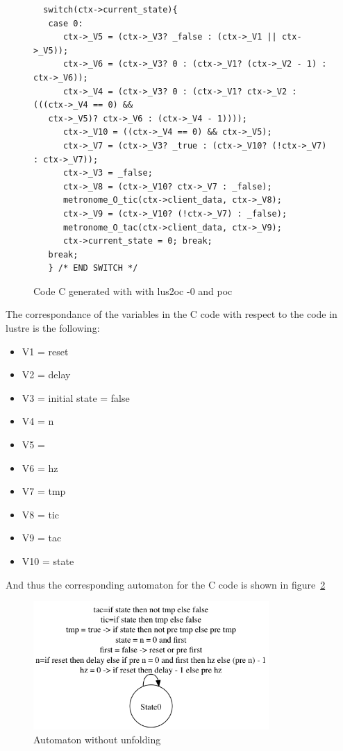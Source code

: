 \documentclass{article}
\begin{document}
\begin{figure}[ht]

\begin{verbatim}
  switch(ctx->current_state){
   case 0:
      ctx->_V5 = (ctx->_V3? _false : (ctx->_V1 || ctx->_V5));
      ctx->_V6 = (ctx->_V3? 0 : (ctx->_V1? (ctx->_V2 - 1) : ctx->_V6));
      ctx->_V4 = (ctx->_V3? 0 : (ctx->_V1? ctx->_V2 : (((ctx->_V4 == 0) &&
   ctx->_V5)? ctx->_V6 : (ctx->_V4 - 1))));
      ctx->_V10 = ((ctx->_V4 == 0) && ctx->_V5);
      ctx->_V7 = (ctx->_V3? _true : (ctx->_V10? (!ctx->_V7) : ctx->_V7));
      ctx->_V3 = _false;
      ctx->_V8 = (ctx->_V10? ctx->_V7 : _false);
      metronome_O_tic(ctx->client_data, ctx->_V8);
      ctx->_V9 = (ctx->_V10? (!ctx->_V7) : _false);
      metronome_O_tac(ctx->client_data, ctx->_V9);
      ctx->current_state = 0; break;
   break;
   } /* END SWITCH */
\end{verbatim}
\label{metronome-0}
\caption{Code C generated with with lus2oc -0 and poc}
\end{figure}

The correspondance of the variables in the C code with
respect to the code in lustre is the following:

\begin{itemize}
\item V1 = reset
\item V2 = delay
\item V3 = initial state = false
\item V4 = n              
\item V5 =          
\item V6 = hz
\item V7 = tmp               
\item V8 = tic  
\item V9 = tac
\item V10 = state
\end{itemize}

And thus the corresponding automaton for the C code is shown
in figure~\ref{automaton-0}

\begin{figure}[!ht]
\begin{center}
\includegraphics[width=0.8\textwidth, natwidth=610,natheight=642] {automaton-0.png}
\end{center}
\label{automaton-0}
\caption{Automaton without unfolding}
\end{figure}
\end{document}
